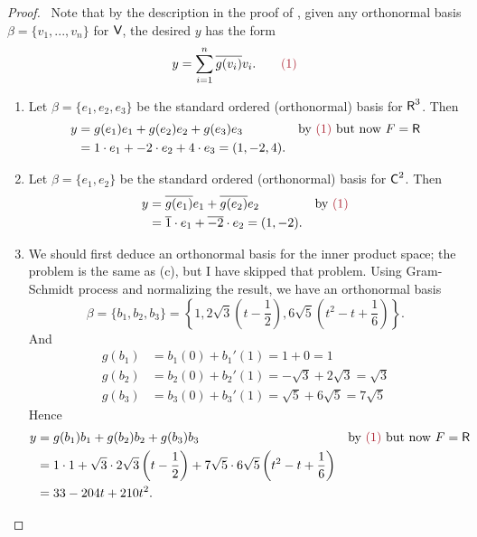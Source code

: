 \begin{proof} \ 
Note that by the description in the proof of , given any orthonormal basis \(\beta = \{ v_1, ..., v_n \}\) for \(\textsf{V}\), the desired \(y\) has the form
\[
    y = \sum_{i = 1}^n \conjugatet{g(v_i)}v_i. \quad \quad \MAROON{(1)}
\]

\begin{enumerate}
\item Let \(\beta = \{ e_1, e_2, e_3 \}\) be the standard ordered (orthonormal) basis for \(\textsf{R}^3\).
Then
\begin{align*}
    y & = g(e_1)e_1 + g(e_2)e_2 + g(e_3)e_3 & \text{by \MAROON{(1)} but now \(F = \SET{R}\)} \\
      & = 1 \cdot e_1 + -2 \cdot e_2 + 4 \cdot e_3 = (1, -2, 4).
\end{align*}

\item Let \(\beta = \{ e_1, e_2 \}\) be the standard ordered (orthonormal) basis for \(\textsf{C}^2\).
Then
\begin{align*}
    y & = \conjugatet{g(e_1)}e_1 + \conjugatet{g(e_2)}e_2 & \text{by \MAROON{(1)}} \\
      & = \conjugatet{1} \cdot e_1 + \conjugatet{-2} \cdot e_2 = (1, -2).
\end{align*}

\item We should first deduce an orthonormal basis for the inner product space; the problem is the same as (c), but I have skipped that problem.
Using Gram-Schmidt process and normalizing the result, we have an orthonormal basis
\[
    \beta = \{ b_1, b_2, b_3 \} = \left\{ 1, 2\sqrt{3} \left( t - \frac{1}{2} \right), 6\sqrt{5} \left( t^2 - t + \frac{1}{6} \right) \right\}.
\]
And
\begin{align*}
    g(b_1) & = b_1(0) + b_1'(1) = 1 + 0 = 1 \\
    g(b_2) & = b_2(0) + b_2'(1) = -\sqrt{3} + 2\sqrt{3} = \sqrt{3} \\
    g(b_3) & = b_3(0) + b_3'(1) = \sqrt{5} + 6\sqrt{5} = 7\sqrt{5}
\end{align*}
Hence
\begin{align*}
    y & = g(b_1) b_1 + g(b_2) b_2 + g(b_3) b_3 & \text{by \MAROON{(1)} but now \(F = \SET{R}\)} \\
      & = 1 \cdot 1 + \sqrt{3} \cdot 2\sqrt{3} \left( t - \frac{1}{2} \right) + 7\sqrt{5} \cdot 6\sqrt{5} \left( t^2 - t + \frac{1}{6} \right) \\
      & = 33 - 204t + 210t^2.
\end{align*}
\end{enumerate}
\end{proof}

